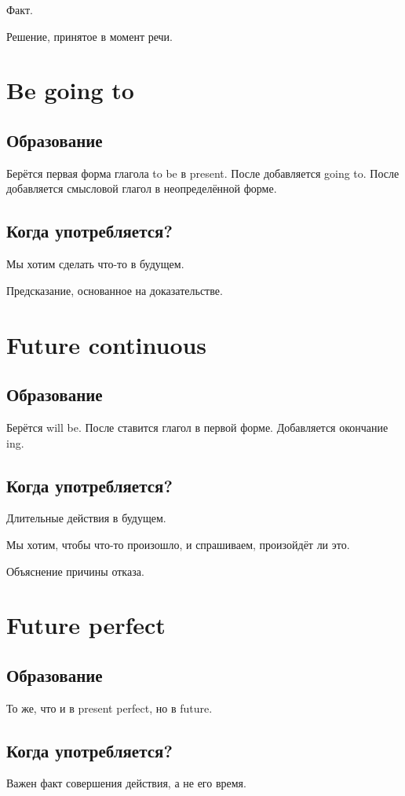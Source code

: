 \documentclass[oneside]{book}
\begin{document}
Факт.

Решение, принятое в момент речи.

\section{Be going to}
\subsection{Образование}
Берётся первая форма глагола to be в present. После добавляется going to.
После добавляется смысловой глагол в неопределённой форме.

\subsection{Когда употребляется?}
Мы хотим сделать что-то в будущем.

Предсказание, основанное на доказательстве.

\section{Future continuous}
\subsection{Образование}
Берётся will be. После ставится глагол в первой форме. Добавляется окончание ing.

\subsection{Когда употребляется?}
Длительные действия в будущем.

Мы хотим, чтобы что-то произошло, и спрашиваем, произойдёт ли это.

Объяснение причины отказа.

\section{Future perfect}
\subsection{Образование}
То же, что и в present perfect, но в future.

\subsection{Когда употребляется?}
Важен факт совершения действия, а не его время.
\end{document}
